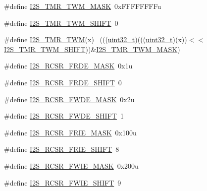 \begin{DoxyCompactItemize}
\item 
\#define \hyperlink{group___i2_s___register___masks_ga0c694ab6fec26ca6fc159fe1d8ccb591}{I2\+S\+\_\+\+T\+M\+R\+\_\+\+T\+W\+M\+\_\+\+M\+A\+SK}~0x\+F\+F\+F\+F\+F\+F\+F\+Fu
\item 
\#define \hyperlink{group___i2_s___register___masks_ga50ccb20fbe6c1de252bfe8ffba29fb3e}{I2\+S\+\_\+\+T\+M\+R\+\_\+\+T\+W\+M\+\_\+\+S\+H\+I\+FT}~0
\item 
\#define \hyperlink{group___i2_s___register___masks_ga315984ee92e2beaca2c9faa4c824a8ae}{I2\+S\+\_\+\+T\+M\+R\+\_\+\+T\+WM}(x)                                                  ~(((\hyperlink{_p_e___types_8h_a33594304e786b158f3fb30289278f5af}{uint32\+\_\+t})(((\hyperlink{_p_e___types_8h_a33594304e786b158f3fb30289278f5af}{uint32\+\_\+t})(x))$<$$<$\hyperlink{group___i2_s___register___masks_ga50ccb20fbe6c1de252bfe8ffba29fb3e}{I2\+S\+\_\+\+T\+M\+R\+\_\+\+T\+W\+M\+\_\+\+S\+H\+I\+FT}))\&\hyperlink{group___i2_s___register___masks_ga0c694ab6fec26ca6fc159fe1d8ccb591}{I2\+S\+\_\+\+T\+M\+R\+\_\+\+T\+W\+M\+\_\+\+M\+A\+SK})
\item 
\#define \hyperlink{group___i2_s___register___masks_gaf82cfc347ee6a04baec92ebf5198b06c}{I2\+S\+\_\+\+R\+C\+S\+R\+\_\+\+F\+R\+D\+E\+\_\+\+M\+A\+SK}~0x1u
\item 
\#define \hyperlink{group___i2_s___register___masks_ga989180bd00d082c32921f39944f70c01}{I2\+S\+\_\+\+R\+C\+S\+R\+\_\+\+F\+R\+D\+E\+\_\+\+S\+H\+I\+FT}~0
\item 
\#define \hyperlink{group___i2_s___register___masks_gaba9d1c2766ec4f47df5ea6316e050cd0}{I2\+S\+\_\+\+R\+C\+S\+R\+\_\+\+F\+W\+D\+E\+\_\+\+M\+A\+SK}~0x2u
\item 
\#define \hyperlink{group___i2_s___register___masks_gac9c4253d0b73811583bb620a5f61f1ad}{I2\+S\+\_\+\+R\+C\+S\+R\+\_\+\+F\+W\+D\+E\+\_\+\+S\+H\+I\+FT}~1
\item 
\#define \hyperlink{group___i2_s___register___masks_ga97cd414600a5d5077af214ef0c166dc0}{I2\+S\+\_\+\+R\+C\+S\+R\+\_\+\+F\+R\+I\+E\+\_\+\+M\+A\+SK}~0x100u
\item 
\#define \hyperlink{group___i2_s___register___masks_ga4f7d0729441e65e811ddbcf701db7692}{I2\+S\+\_\+\+R\+C\+S\+R\+\_\+\+F\+R\+I\+E\+\_\+\+S\+H\+I\+FT}~8
\item 
\#define \hyperlink{group___i2_s___register___masks_ga220d8d29a1d3adbf9b2e25b2a0e43fa7}{I2\+S\+\_\+\+R\+C\+S\+R\+\_\+\+F\+W\+I\+E\+\_\+\+M\+A\+SK}~0x200u
\item 
\#define \hyperlink{group___i2_s___register___masks_ga95d98fa004363d636a9d0496cb02772c}{I2\+S\+\_\+\+R\+C\+S\+R\+\_\+\+F\+W\+I\+E\+\_\+\+S\+H\+I\+FT}~9
$$
\end{DoxyCompactItemize}
